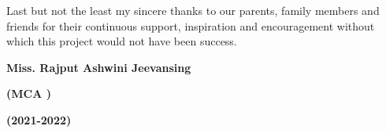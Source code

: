 \documentclass{article} %
\begin{document}
\noindent  Last but not the least my sincere thanks to our parents, family members and friends for their continuous support, inspiration and encouragement without which this project would not have been success.

\noindent 

\noindent 

\noindent 

\noindent 

\noindent 

\noindent \textbf{Miss. Rajput Ashwini Jeevansing}

\noindent \textbf{                                                                                                                (MCA )}

\noindent \textbf{                                                                                                                       (2021-2022)}

\noindent \textbf{}

\noindent \textbf{\underbar{}}

\textbf{                                             }

\noindent \textbf{}

\noindent \textbf{}
\end{document}

